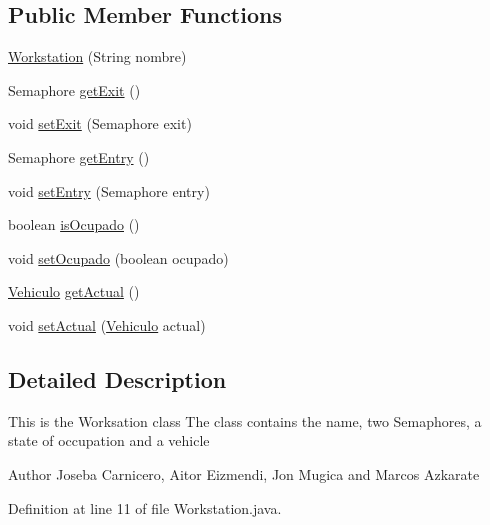 \subsection*{Public Member Functions}
\begin{DoxyCompactItemize}
\item 
\mbox{\hyperlink{classsimulator_1_1_workstation_a8b60b663f6370c910ec1ffaa84f464bb}{Workstation}} (String nombre)
\item 
Semaphore \mbox{\hyperlink{classsimulator_1_1_workstation_a0d389f9b0ca28ff6648467370afdb858}{get\+Exit}} ()
\item 
void \mbox{\hyperlink{classsimulator_1_1_workstation_a8807fa5c10a39810306359971abd58f0}{set\+Exit}} (Semaphore exit)
\item 
Semaphore \mbox{\hyperlink{classsimulator_1_1_workstation_af1001364022448a27a66b864376cdeff}{get\+Entry}} ()
\item 
void \mbox{\hyperlink{classsimulator_1_1_workstation_a1addeff99cf0ca9aaa020fe328a4f3fd}{set\+Entry}} (Semaphore entry)
\item 
boolean \mbox{\hyperlink{classsimulator_1_1_workstation_a9a306b4b5b6b740f9d284903c0f0eda4}{is\+Ocupado}} ()
\item 
void \mbox{\hyperlink{classsimulator_1_1_workstation_abc348d8ecea62cb7893d861ccc041c86}{set\+Ocupado}} (boolean ocupado)
\item 
\mbox{\hyperlink{classsimulator_1_1_vehiculo}{Vehiculo}} \mbox{\hyperlink{classsimulator_1_1_workstation_a017b4b43beb08ad12645ff2278543b49}{get\+Actual}} ()
\item 
void \mbox{\hyperlink{classsimulator_1_1_workstation_acf19a56acc88e29bdc0a394287eb6108}{set\+Actual}} (\mbox{\hyperlink{classsimulator_1_1_vehiculo}{Vehiculo}} actual)
\end{DoxyCompactItemize}


\subsection{Detailed Description}
This is the Worksation class The class contains the name, two Semaphores, a state of occupation and a vehicle

\begin{DoxyAuthor}{Author}
Joseba Carnicero, Aitor Eizmendi, Jon Mugica and Marcos Azkarate 
\end{DoxyAuthor}


Definition at line 11 of file Workstation.\+java.



